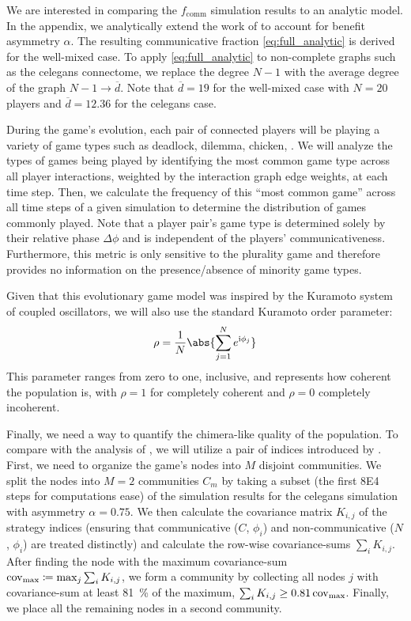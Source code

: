 \documentclass[pdflatex,lineno,referee,sn-mathphys-ay]{sn-jnl}
\begin{document}
We are interested in comparing the $f_{\text{comm}}$ simulation results
to an analytic model.
In the appendix, we analytically extend the work of \citet{tripp2022evolutionary}
to account for benefit asymmetry $\alpha$.
The resulting communicative fraction \cref{eq:full_analytic}
is derived for the well-mixed case.
To apply \cref{eq:full_analytic} to non-complete graphs such as
the \gls{celegans} connectome,
we replace the degree $N-1$ with the average degree of the graph
$N-1 \to \overline{d}$.
Note that $\overline{d} = \num{19}$
for the well-mixed case with $N=20$ players
and $\overline{d} = \num{12.36}$ for the \gls{celegans} case.

During the game's evolution,
each pair of connected players will be playing a variety of game types
such as deadlock, dilemma, chicken, \etc{}
\citep[\cf{}][for definitions]{bruns2015names}.
We will analyze the types of games being played by
identifying the most common game type across all player interactions,
weighted by the interaction graph edge weights,
at each time step.
Then, we calculate the frequency of this ``most common game'' across
all time steps of a given simulation to determine the distribution
of games commonly played.
Note that a player pair's game type is determined solely
by their relative phase $\Delta \phi$ and is independent
of the players' communicativeness.
Furthermore, this metric is only sensitive to the
plurality game and therefore provides no information
on the presence/absence of minority game types.

Given that this evolutionary game model was inspired
by the Kuramoto system of coupled oscillators,
we will also use the standard Kuramoto order parameter:
\begin{equation}
  \rho = \frac{1}{N} \abs{\sum_{j=1}^N e^{\im \phi_j}}
  \label{eq:order_parameter}
\end{equation}
This parameter ranges from zero to one, inclusive,
and represents how coherent the population is,
with $\rho = 1$ for completely coherent and $\rho = 0$ completely incoherent.

Finally, we need a way to quantify
the chimera-like quality of the population.
To compare with the analysis of \citet{hizanidis2016chimera},
we will utilize a pair of indices introduced
by \citet{shanahan2010metastable}.
First, we need to organize the game's nodes
into $M$ disjoint communities.
We split the nodes into $M=2$ communities $C_m$
by taking a subset
(the first \num{8E4} steps for computations ease)
of the simulation results
for the \gls{celegans} simulation with asymmetry $\alpha = \num{0.75}$.
We then calculate the covariance matrix $K_{i,j}$ of the strategy indices
(ensuring that communicative ($C$, $\phi_i$)
and non-communicative ($N$, $\phi_i$) are treated distinctly)
and calculate the row-wise covariance-sums  $\sum_i K_{i,j}$.
After finding the node with the maximum covariance-sum
$\operatorname{cov}_{\text{max}} \coloneqq \max_j{\sum_i K_{i,j}}$,
we form a community by collecting all nodes $j$ with covariance-sum
at least \SI{81}{\percent} of the maximum,
$\sum_i K_{i,j} \ge \num{0.81} \operatorname{cov}_{\text{max}}$.
Finally, we place all the remaining nodes in a second community.
\end{document}
